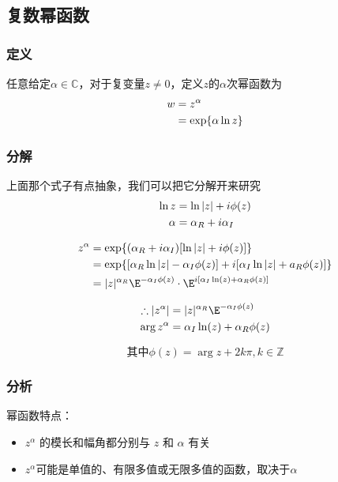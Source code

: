 
\begin{issues}
\issueDraft
\issueTODO
\end{issues}



\subsection{复数幂函数}

\subsubsection{定义}
任意给定$\alpha\in \mathbb{C}$，对于复变量$z\ne 0$，定义$z$的$\alpha$次幂函数为
\begin{align}
w&=z^\alpha\notag\\
&=\exp\{\alpha \ln z\}
\end{align}
\subsubsection{分解}
上面那个式子有点抽象，我们可以把它分解开来研究
\begin{align}
\ln z &= \ln |z|+i\phi(z)\notag\\
\alpha&=\alpha_R+i\alpha_I\notag\\
\end{align}

\begin{align}
z^\alpha&=\exp\{(\alpha_R+i\alpha_I)[\ln |z|+i\phi(z)]\notag\}\\
&=\exp\{[\alpha_R \ln|z|-\alpha_I\phi (z)]+i[\alpha_I\ln|z|+a_R\phi(z)]\}\notag\\
&=|z|^{\alpha_R}\E^{-\alpha_I\phi(z)}\cdot \E^{i[\alpha_I\ln(z)+\alpha_R\phi(z)]}
\end{align}

\begin{align}
\therefore |z^\alpha|&=|z|^{\alpha_R}\E^{-\alpha_I\phi(z)}\notag\\
\arg z^\alpha&=\alpha_I\ln(z)+\alpha_R\phi(z)\notag
\end{align}

\[\text{其中}\phi(z)=\arg z+2k\pi,k\in\mathbb Z\]

\subsubsection{分析}
幂函数特点：\\
\begin{itemize}
\item $z^\alpha$ 的模长和幅角都分别与 $z$ 和 $\alpha$ 有关\\
\item $z^\alpha$可能是单值的、有限多值或无限多值的函数，取决于$\alpha$
\end{itemize}


